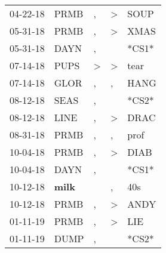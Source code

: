 \begin{supertabular}{p{0.07\textwidth}p{0.06\textwidth}p{0.02\textwidth}p{0.02\textwidth}p{0.06\textwidth}}
          04-22-18\textsuperscript{} &           PRMB\textsuperscript{} &                , &     \textgreater &           SOUP\textsuperscript{} \\
          05-31-18\textsuperscript{} &           PRMB\textsuperscript{} &                , &     \textgreater &           XMAS\textsuperscript{} \\
          05-31-18\textsuperscript{} &           DAYN\textsuperscript{} &                , &                  &                            *CS1* \\
          07-14-18\textsuperscript{} &           PUPS\textsuperscript{} &     \textgreater &     \textgreater &           tear\textsuperscript{} \\
          07-14-18\textsuperscript{} &           GLOR\textsuperscript{} &                , &                , &           HANG\textsuperscript{} \\
          08-12-18\textsuperscript{} &           SEAS\textsuperscript{} &                , &                  &                            *CS2* \\
          08-12-18\textsuperscript{} &           LINE\textsuperscript{} &                , &     \textgreater &           DRAC\textsuperscript{} \\
          08-31-18\textsuperscript{} &           PRMB\textsuperscript{} &                , &                , &           prof\textsuperscript{} \\
          10-04-18\textsuperscript{} &           PRMB\textsuperscript{} &                , &     \textgreater &           DIAB\textsuperscript{} \\
          10-04-18\textsuperscript{} &           DAYN\textsuperscript{} &                , &                  &                            *CS1* \\
          10-12-18\textsuperscript{} &  \textbf{milk\textsuperscript{}} &                  &                , &            40s\textsuperscript{} \\
          10-12-18\textsuperscript{} &           PRMB\textsuperscript{} &                , &     \textgreater &           ANDY\textsuperscript{} \\
          01-11-19\textsuperscript{} &           PRMB\textsuperscript{} &                , &     \textgreater &            LIE\textsuperscript{} \\
          01-11-19\textsuperscript{} &           DUMP\textsuperscript{} &                , &                  &                            *CS2* \\

\end{supertabular}
